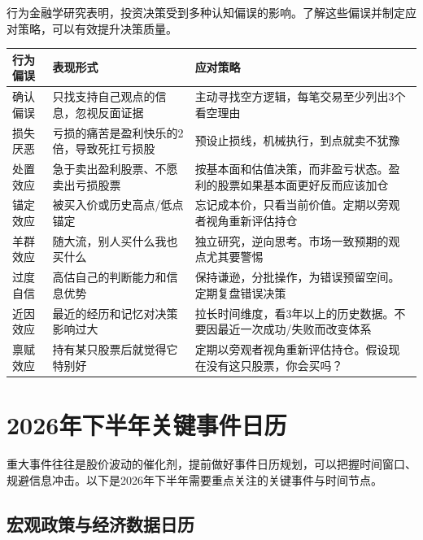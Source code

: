 行为金融学研究表明，投资决策受到多种认知偏误的影响。了解这些偏误并制定应对策略，可以有效提升决策质量。

\begin{exhibitbox}[表9-30：常见行为偏误与应对策略]
\scriptsize
\setlength{\tabcolsep}{3pt}
\renewcommand{\arraystretch}{1.12}
\begin{tabularx}{\textwidth}{l X X}
\toprule
\textbf{行为偏误} & \textbf{表现形式} & \textbf{应对策略} \\
\midrule
确认偏误 & 只找支持自己观点的信息，忽视反面证据 & 主动寻找空方逻辑，每笔交易至少列出3个看空理由 \\
损失厌恶 & 亏损的痛苦是盈利快乐的2倍，导致死扛亏损股 & 预设止损线，机械执行，到点就卖不犹豫 \\
处置效应 & 急于卖出盈利股票、不愿卖出亏损股票 & 按基本面和估值决策，而非盈亏状态。盈利的股票如果基本面更好反而应该加仓 \\
锚定效应 & 被买入价或历史高点/低点锚定 & 忘记成本价，只看当前价值。定期以旁观者视角重新评估持仓 \\
羊群效应 & 随大流，别人买什么我也买什么 & 独立研究，逆向思考。市场一致预期的观点尤其要警惕 \\
过度自信 & 高估自己的判断能力和信息优势 & 保持谦逊，分批操作，为错误预留空间。定期复盘错误决策 \\
近因效应 & 最近的经历和记忆对决策影响过大 & 拉长时间维度，看3年以上的历史数据。不要因最近一次成功/失败而改变体系 \\
禀赋效应 & 持有某只股票后就觉得它特别好 & 定期以旁观者视角重新评估持仓。假设现在没有这只股票，你会买吗？ \\
\bottomrule
\end{tabularx}
\end{exhibitbox}

\section{2026年下半年关键事件日历}

重大事件往往是股价波动的催化剂，提前做好事件日历规划，可以把握时间窗口、规避信息冲击。以下是2026年下半年需要重点关注的关键事件与时间节点。

\subsection{宏观政策与经济数据日历}

